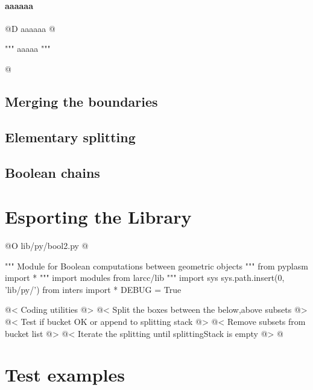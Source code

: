\documentclass[11pt,oneside]{article}    %
\begin{document}
\paragraph{aaaaaa}
@D aaaaaa
@{""" aaaaa """

@}


\subsection{Merging the boundaries}

\subsection{Elementary splitting}

\subsection{Boolean chains}

\section{Esporting the Library}

@O lib/py/bool2.py
@{""" Module for Boolean computations between geometric objects """
from pyplasm import *
""" import modules from larcc/lib """
import sys
sys.path.insert(0, 'lib/py/')
from inters import *
DEBUG = True

@< Coding utilities @>
@< Split the boxes between the below,above subsets @>
@< Test if bucket OK or append to splitting stack @>
@< Remove subsets from bucket list @>
@< Iterate the splitting until splittingStack is empty @>
@}

\section{Test examples}
\end{document}
